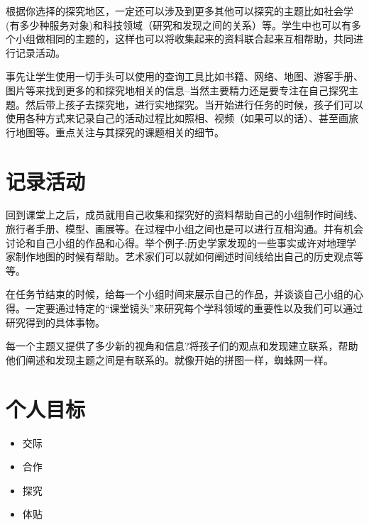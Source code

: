     \par
    根据你选择的探究地区，一定还可以涉及到更多其他可以探究的主题比如社会学(有多少种服务对象)和科技领域（研究和发现之间的关系）等。学生中也可以有多个小组做相同的主题的，这样也可以将收集起来的资料联合起来互相帮助，共同进行记录活动。\par
    事先让学生使用一切手头可以使用的查询工具比如书籍、网络、地图、游客手册、图片等来找到更多的和探究地相关的信息--当然主要精力还是要专注在自己探究主题。然后带上孩子去探究地，进行实地探究。当开始进行任务的时候，孩子们可以使用各种方式来记录自己的活动过程比如照相、视频（如果可以的话）、甚至画旅行地图等。重点关注与其探究的课题相关的细节。\par
    
\section{记录活动}
    回到课堂上之后，成员就用自己收集和探究好的资料帮助自己的小组制作时间线、旅行者手册、模型、画展等。在过程中小组之间也是可以进行互相沟通。并有机会讨论和自己小组的作品和心得。举个例子:历史学家发现的一些事实或许对地理学家制作地图的时候有帮助。艺术家们可以就如何阐述时间线给出自己的历史观点等等。\par
    在任务节结束的时候，给每一个小组时间来展示自己的作品，并谈谈自己小组的心得。一定要通过特定的“课堂镜头”来研究每个学科领域的重要性以及我们可以通过研究得到的具体事物。\par
    每一个主题又提供了多少新的视角和信息?将孩子们的观点和发现建立联系，帮助他们阐述和发现主题之间是有联系的。就像开始的拼图一样，蜘蛛网一样。\par

\section{个人目标}
    \begin{itemize}
      \item 交际
      \item 合作
      \item 探究
      \item 体贴 
    \end{itemize}
